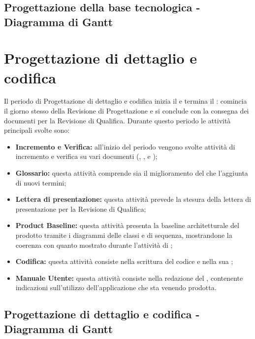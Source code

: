 \documentclass[PianoDiProgetto.tex]{subfiles}
\begin{document}
\begin{landscape}
	\subsection{Progettazione della base tecnologica - Diagramma di Gantt}
\end{landscape}


\section{Progettazione di dettaglio e codifica}
Il periodo di Progettazione di dettaglio e codifica inizia il  e termina il : comincia il giorno stesso della Revisione di Progettazione e si conclude con la consegna dei documenti per la Revisione di Qualifica. Durante questo periodo le attività principali svolte sono:
\begin{itemize}
	\item \textbf{Incremento e Verifica:} all'inizio del periodo vengono svolte attività di incremento e verifica su vari documenti (\ndp, \pdp, \pdq e \tb);
	\item \textbf{Glossario:} questa attività comprende sia il miglioramento del \g che l'aggiunta di nuovi termini;
	\item \textbf{Lettera di presentazione:} questa attività prevede la stesura della lettera di presentazione per la Revisione di Qualifica;
	\item \textbf{Product Baseline:} questa attività presenta la baseline architetturale del prodotto tramite i diagrammi delle classi e di sequenza, mostrandone la coerenza con quanto mostrato durante l'attività di \tb;
	\item \textbf{Codifica:} questa attività consiste nella scrittura del codice e nella sua ;
	\item \textbf{Manuale Utente:} questa attività consiste nella redazione del \mut, contenente indicazioni sull'utilizzo dell'applicazione che sta venendo prodotta.

\end{itemize}
\begin{landscape}
		\subsection{Progettazione di dettaglio e codifica - Diagramma di Gantt}
\end{landscape}
\end{document}
